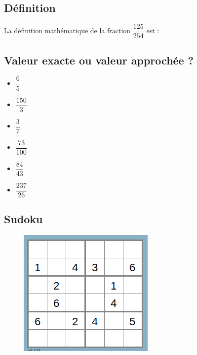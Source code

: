 \subsection*{Définition}
La définition mathématique de la fraction $\dfrac{125}{254}$ est : \dotfill \\ \Pointilles[2]

\begin{multicols}{2}

\subsection*{Valeur exacte ou valeur approchée ?}
\begin{itemize}[label={$\bullet$}]
  \item $\dfrac{6}{5}$ \dotfill \\
  \item $\dfrac{150}{3}$ \dotfill \\
  \item $\dfrac{3}{7}$ \dotfill \\
  \item $\dfrac{73}{100}$ \dotfill \\
  \item $\dfrac{84}{43}$ \dotfill \\
  \item $\dfrac{237}{26}$ \dotfill \\
\end{itemize}  \columnbreak 


\subsection*{Sudoku}
\begin{figure}[H]
  \centering
  \includegraphics[width=0.8\linewidth]{6x5-fractions/sudoku-6b.png}
\end{figure}

\end{multicols}

